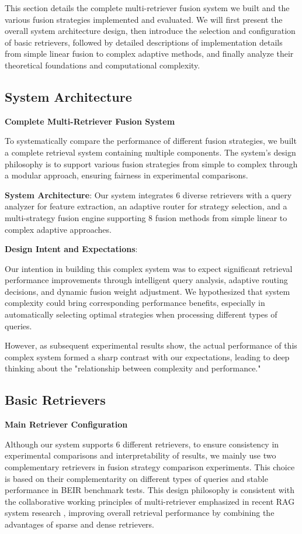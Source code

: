 \documentclass[letterpaper]{article} %
\begin{document}
This section details the complete multi-retriever fusion system we built and the various fusion strategies implemented and evaluated. We will first present the overall system architecture design, then introduce the selection and configuration of basic retrievers, followed by detailed descriptions of implementation details from simple linear fusion to complex adaptive methods, and finally analyze their theoretical foundations and computational complexity.

\subsection{System Architecture}

\textbf{Complete Multi-Retriever Fusion System}

To systematically compare the performance of different fusion strategies, we built a complete retrieval system containing multiple components. The system's design philosophy is to support various fusion strategies from simple to complex through a modular approach, ensuring fairness in experimental comparisons.

\textbf{System Architecture}: Our system integrates 6 diverse retrievers with a query analyzer for feature extraction, an adaptive router for strategy selection, and a multi-strategy fusion engine supporting 8 fusion methods from simple linear to complex adaptive approaches.

\textbf{Design Intent and Expectations}:

Our intention in building this complex system was to expect significant retrieval performance improvements through intelligent query analysis, adaptive routing decisions, and dynamic fusion weight adjustment. We hypothesized that system complexity could bring corresponding performance benefits, especially in automatically selecting optimal strategies when processing different types of queries.

However, as subsequent experimental results show, the actual performance of this complex system formed a sharp contrast with our expectations, leading to deep thinking about the "relationship between complexity and performance."

\subsection{Basic Retrievers}

\textbf{Main Retriever Configuration}

Although our system supports 6 different retrievers, to ensure consistency in experimental comparisons and interpretability of results, we mainly use two complementary retrievers in fusion strategy comparison experiments. This choice is based on their complementarity on different types of queries and stable performance in BEIR benchmark tests. This design philosophy is consistent with the collaborative working principles of multi-retriever emphasized in recent RAG system research \cite{gao2024retrieval}, improving overall retrieval performance by combining the advantages of sparse and dense retrievers.
\end{document}
